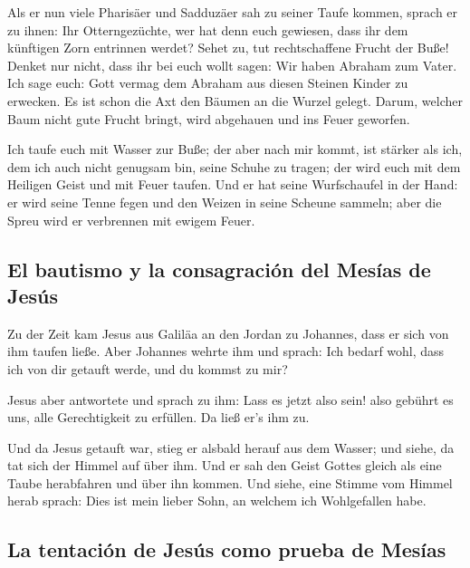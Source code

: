  Als er nun viele Pharisäer und Sadduzäer sah zu seiner
Taufe kommen, sprach er zu ihnen: Ihr Otterngezüchte, wer hat denn euch
gewiesen, dass ihr dem künftigen Zorn entrinnen werdet? 
Sehet zu, tut rechtschaffene Frucht der Buße!  Denket nur
nicht, dass ihr bei euch wollt sagen: Wir haben Abraham zum Vater. Ich
sage euch: Gott vermag dem Abraham aus diesen Steinen Kinder zu
erwecken.  Es ist schon die Axt den Bäumen an die Wurzel
gelegt. Darum, welcher Baum nicht gute Frucht bringt, wird abgehauen und
ins Feuer geworfen.

 Ich taufe euch mit Wasser zur Buße; der aber nach mir
kommt, ist stärker als ich, dem ich auch nicht genugsam bin, seine
Schuhe zu tragen; der wird euch mit dem Heiligen Geist und mit Feuer
taufen.  Und er hat seine Wurfschaufel in der Hand: er
wird seine Tenne fegen und den Weizen in seine Scheune sammeln; aber die
Spreu wird er verbrennen mit ewigem Feuer.

\hypertarget{el-bautismo-y-la-consagraciuxf3n-del-mesuxedas-de-jesuxfas}{%
\subsection{El bautismo y la consagración del Mesías de
Jesús}\label{el-bautismo-y-la-consagraciuxf3n-del-mesuxedas-de-jesuxfas}}

 Zu der Zeit kam Jesus aus Galiläa an den Jordan zu
Johannes, dass er sich von ihm taufen ließe.  Aber
Johannes wehrte ihm und sprach: Ich bedarf wohl, dass ich von dir
getauft werde, und du kommst zu mir?

 Jesus aber antwortete und sprach zu ihm: Lass es jetzt
also sein! also gebührt es uns, alle Gerechtigkeit zu erfüllen. Da ließ
er's ihm zu.

 Und da Jesus getauft war, stieg er alsbald herauf aus
dem Wasser; und siehe, da tat sich der Himmel auf über ihm. Und er sah
den Geist Gottes gleich als eine Taube herabfahren und über ihn kommen.
 Und siehe, eine Stimme vom Himmel herab sprach: Dies ist
mein lieber Sohn, an welchem ich Wohlgefallen habe.

\hypertarget{la-tentaciuxf3n-de-jesuxfas-como-prueba-de-mesuxedas}{%
\subsection{La tentación de Jesús como prueba de
Mesías}\label{la-tentaciuxf3n-de-jesuxfas-como-prueba-de-mesuxedas}}

